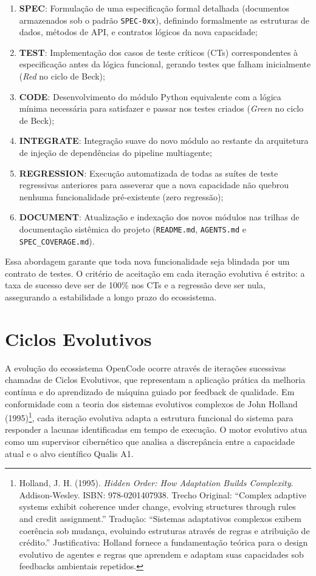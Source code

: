 \documentclass[12pt,a4paper,oneside]{abntex2}
\begin{document}
\begin{enumerate}
    \item \textbf{SPEC}: Formulação de uma especificação formal detalhada (documentos armazenados sob o padrão \texttt{SPEC-0xx}), definindo formalmente as estruturas de dados, métodos de API, e contratos lógicos da nova capacidade;
    \item \textbf{TEST}: Implementação dos casos de teste críticos (CTs) correspondentes à especificação antes da lógica funcional, gerando testes que falham inicialmente (\textit{Red} no ciclo de Beck);
    \item \textbf{CODE}: Desenvolvimento do módulo Python equivalente com a lógica mínima necessária para satisfazer e passar nos testes criados (\textit{Green} no ciclo de Beck);
    \item \textbf{INTEGRATE}: Integração suave do novo módulo ao restante da arquitetura de injeção de dependências do pipeline multiagente;
    \item \textbf{REGRESSION}: Execução automatizada de todas as suítes de teste regressivas anteriores para asseverar que a nova capacidade não quebrou nenhuma funcionalidade pré-existente (zero regressão);
    \item \textbf{DOCUMENT}: Atualização e indexação dos novos módulos nas trilhas de documentação sistêmica do projeto (\texttt{README.md}, \texttt{AGENTS.md} e \texttt{SPEC\_COVERAGE.md}).
\end{enumerate}

Essa abordagem garante que toda nova funcionalidade seja blindada por um contrato de testes. O critério de aceitação em cada iteração evolutiva é estrito: a taxa de sucesso deve ser de 100\% nos CTs e a regressão deve ser nula, assegurando a estabilidade a longo prazo do ecossistema.

\section{Ciclos Evolutivos}

A evolução do ecossistema OpenCode ocorre através de iterações sucessivas chamadas de Ciclos Evolutivos, que representam a aplicação prática da melhoria contínua e do aprendizado de máquina guiado por feedback de qualidade. Em conformidade com a teoria dos sistemas evolutivos complexos de John Holland (1995)\footnote{Holland, J. H. (1995). \textit{Hidden Order: How Adaptation Builds Complexity}. Addison-Wesley. ISBN: 978-0201407938. Trecho Original: ``Complex adaptive systems exhibit coherence under change, evolving structures through rules and credit assignment.'' Tradução: ``Sistemas adaptativos complexos exibem coerência sob mudança, evoluindo estruturas através de regras e atribuição de crédito.'' Justificativa: Holland fornece a fundamentação teórica para o design evolutivo de agentes e regras que aprendem e adaptam suas capacidades sob feedbacks ambientais repetidos.}, cada iteração evolutiva adapta a estrutura funcional do sistema para responder a lacunas identificadas em tempo de execução. O motor evolutivo atua como um supervisor cibernético que analisa a discrepância entre a capacidade atual e o alvo científico Qualis A1.
\end{document}

